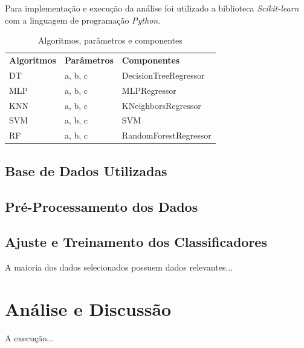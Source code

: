 \documentclass[12pt]{article}
\begin{document}
Para implementação e execução da análise foi utilizado a biblioteca \textit{Scikit-learn} \cite{scikitlearn:2011} com a linguagem de programação \textit{Python}.

\begin{table}[h!]
  \begin{center}
    \caption{Algoritmos, parâmetros e componentes}
    \label{tab_algoritmos}
    \begin{tabular}{l|l|l}
      \textbf{Algoritmos} & \textbf{Parâmetros} & \textbf{Componentes}  \\
      DT                  & a, b, c             & DecisionTreeRegressor \\
      MLP                 & a, b, c             & MLPRegressor          \\
      KNN                 & a, b, c             & KNeighborsRegressor   \\
      SVM                 & a, b, c             & SVM                   \\
      RF                  & a, b, c             & RandomForestRegressor \\
    \end{tabular}
  \end{center}
\end{table}

\subsection{Base de Dados Utilizadas}


\subsection{Pré-Processamento dos Dados}


\subsection{Ajuste e Treinamento dos Classificadores}

A maioria dos dados selecionados possuem dados relevantes...

\section{Análise e Discussão}

A execução...
\end{document}
